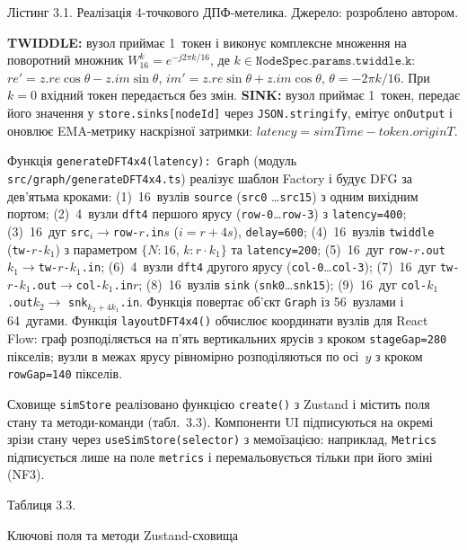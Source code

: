 Лістинг 3.1. Реалізація 4-точкового ДПФ-метелика. Джерело: розроблено автором.

\textbf{TWIDDLE:} вузол приймає 1~токен і виконує комплексне множення на
поворотний множник \(W_{16}^{k}=e^{-j2\pi k/16}\), де
\(k\in\texttt{NodeSpec.params.twiddle.k}\): \({re}'=z.re\cos\theta-z.im\sin\theta\),
\({im}'=z.re\sin\theta+z.im\cos\theta\), \(\theta=-2\pi k/16\). При
\(k=0\) вхідний токен передається без змін. \textbf{SINK:} вузол приймає
1~токен, передає його значення у \texttt{store.sinks[nodeId]} через
\texttt{JSON.stringify}, емітує \texttt{onOutput} і оновлює EMA-метрику
наскрізної затримки: \(latency=simTime-token.originT\).

Функція \texttt{generateDFT4x4(latency): Graph} (модуль
\texttt{src/graph/generateDFT4x4.ts}) реалізує шаблон Factory і будує
DFG за дев'ятьма кроками: (1)~16~вузлів \texttt{source} (\texttt{src0}
\ldots\texttt{src15}) з одним вихідним портом; (2)~4~вузли \texttt{dft4}
першого ярусу (\texttt{row-0}\ldots\texttt{row-3}) з \texttt{latency=400};
(3)~16~дуг \texttt{src}$_i\rightarrow$\texttt{row-}$r$\texttt{.in}$s$
(\(i=r+4s\)), \texttt{delay=600}; (4)~16~вузлів \texttt{twiddle}
(\texttt{tw-}$r$\texttt{-}$k_1$) з параметром \(\{N:16,\,k:r\cdot k_1\}\)
та \texttt{latency=200}; (5)~16~дуг
\texttt{row-}$r$\texttt{.out}$k_1\rightarrow$\texttt{tw-}$r$\texttt{-}$k_1$\texttt{.in};
(6)~4~вузли \texttt{dft4} другого ярусу (\texttt{col-0}\ldots\texttt{col-3});
(7)~16~дуг
\texttt{tw-}$r$\texttt{-}$k_1$\texttt{.out}$\rightarrow$\texttt{col-}$k_1$\texttt{.in}$r$;
(8)~16~вузлів \texttt{sink} (\texttt{snk0}\ldots\texttt{snk15});
(9)~16~дуг \texttt{col-}$k_1$\texttt{.out}$k_2\rightarrow$
\texttt{snk}$_{k_2+4k_1}$\texttt{.in}. Функція повертає об'єкт
\texttt{Graph} із 56~вузлами і 64~дугами. Функція
\texttt{layoutDFT4x4()} обчислює координати вузлів для React Flow:
граф розподіляється на п'ять вертикальних ярусів з кроком
\texttt{stageGap=280} пікселів; вузли в межах ярусу рівномірно
розподіляються по осі~\(y\) з кроком \texttt{rowGap=140} пікселів.

Сховище \texttt{simStore} реалізовано функцією \texttt{create()} з
Zustand і містить поля стану та методи-команди (табл.~3.3). Компоненти UI
підписуються на окремі зрізи стану через \texttt{useSimStore(selector)}
з мемоїзацією: наприклад, \texttt{Metrics} підписується лише на поле
\texttt{metrics} і перемальовується тільки при його зміні (NF3).

Таблиця 3.3.

Ключові поля та методи Zustand-сховища


